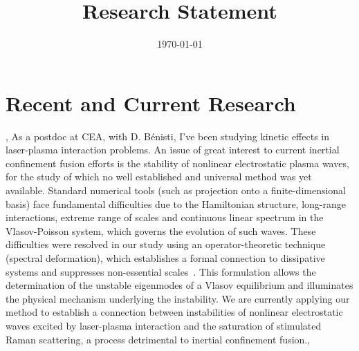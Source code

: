 \documentclass[11pt,a4paper,final]{moderncv}
\title{Research Statement}               %
\date{\today}
\begin{document}
 \maketitle



\section{Recent and Current Research}
\sep
{}
As a postdoc at CEA, with D. B\'enisti, I've been studying kinetic 
effects in laser-plasma interaction problems. An issue of great
interest to current inertial confinement fusion efforts is the stability 
of nonlinear electrostatic plasma waves, for the study of which no well established 
and universal method was yet available. 
Standard numerical tools (such as projection onto a finite-dimensional basis) 
face fundamental difficulties due to the Hamiltonian structure, 
long-range interactions, extreme range of scales and continuous linear spectrum 
in the Vlasov-Poisson system, which governs the evolution of such waves. 
These difficulties were resolved in our study using 
an operator-theoretic technique (spectral deformation), 
which establishes a formal connection to dissipative systems and suppresses 
non-essential scales~\cite{siminos11}. This formulation allows the determination 
of the unstable eigenmodes of a Vlasov equilibrium and illuminates 
the physical mechanism underlying the instability.
We are currently applying our method to establish a connection between
instabilities of nonlinear electrostatic waves excited by laser-plasma
interaction and the saturation of stimulated Raman scattering, %
a process detrimental to inertial confinement fusion.\sep
\end{document}
